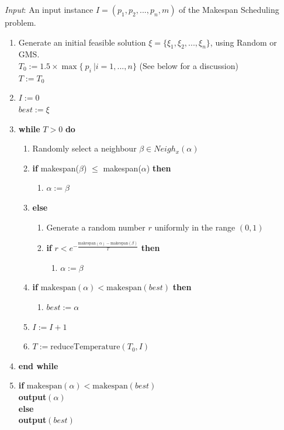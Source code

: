 \documentclass[12pt,a4paper,reqno]{article}
\begin{document}
\emph{Input}: An input instance $I = (p_1,p_2,...,p_n,m)$ of the Makespan Scheduling problem.
\begin{enumerate}
\item Generate an initial feasible solution $\xi = \{\xi_1,\xi_2,...,\xi_n\}$, using Random or GMS. \\
$T_0 := 1.5 \times \max\{ \> p_i \>  | i = 1,...,n \}$ (See below for a discussion) \\
$T:=T_0$
\item $I := 0$ \\
$best:=\xi$
\item\textbf{while} $T>0$ \textbf{do}
\begin{enumerate}
\item Randomly select a neighbour $\beta\in Neigh_x(\alpha)$
\item \textbf{if} makespan($\beta$) $\leq$ makespan($\alpha$) \textbf{then}
\begin{enumerate}
\item $\alpha:=\beta$
\end{enumerate}
\item[] \textbf{else}
\begin{enumerate}
\item Generate a random number $r$ uniformly in the range $(0,1)$
\item \textbf{if} $r<e^{-\frac{\text{makespan}(\alpha)-\text{makespan}(\beta)}{T}}$ \textbf{then}
\begin{enumerate}
\item[] $\alpha:=\beta$
\end{enumerate}
\end{enumerate}
\item \textbf{if}
$\text{makespan}(\alpha) < \text{makespan}(best)$ \textbf{then}
\begin{enumerate}
\item[] $best:=\alpha$
\end{enumerate}
\item $I:=I+1$
\item $T:=\text{reduceTemperature}(T_0,I)$
\end{enumerate}
\item[] \textbf{end while}
\item \textbf{if} $\text{makespan}(\alpha) < \text{makespan}(best)$ \\
\indent \textbf{output}$(\alpha)$ \\
\textbf{else} \\
\indent \textbf{output}$(best)$
\end{enumerate}
\end{document}
